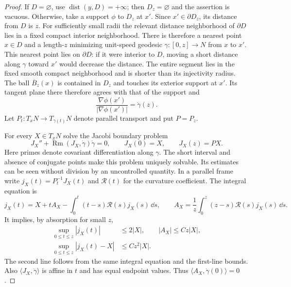 \begin{proof}
If $D=\varnothing$, use $\operatorname{dist}(y,D)=+\infty$;
then $D_z=\varnothing$ and the assertion is vacuous.  Otherwise,
take a support $\phi$ to $D_z$ at $x'$.  Since $x'\in\partial D_z$,
its distance from $D$ is $z$.  For sufficiently small radii the
relevant distance neighborhood of $\partial D$ lies in a fixed
compact interior neighborhood.  There is therefore a nearest point
$x\in D$ and a length-$z$ minimizing unit-speed geodesic
$\gamma:[0,z]\to N$ from $x$ to $x'$.  This nearest point lies on
$\partial D$: if it were interior to $D$, moving a short distance
along $\gamma$ toward $x'$ would decrease the distance.  The entire
segment lies in the fixed smooth compact neighborhood and is
shorter than its injectivity radius.  The ball
$\overline B_z(x)$ is contained in $D_z$ and touches its exterior
support at $x'$.  Its tangent plane there therefore agrees with that
of the support and
\begin{equation}\label{n3:domains:radial-normal}
 \frac{\nabla\phi(x')}{|\nabla\phi(x')|}=\dot\gamma(z).
\end{equation}
Let $P_t:T_xN\to T_{\gamma(t)}N$ denote parallel transport and put
$P=P_z$.

For every $X\in T_xN$ solve the Jacobi boundary problem
\begin{equation}\label{n3:domains:jacobi-endpoints}
 J_X''+\operatorname{Rm}(J_X,\dot\gamma)\dot\gamma=0,
 \qquad J_X(0)=X,\qquad J_X(z)=PX.
\end{equation}
Here primes denote covariant differentiation along $\gamma$.
The short interval and absence of conjugate points make this problem
uniquely solvable.  Its estimates can be seen without division by an
uncontrolled quantity.  In a parallel frame write
$j_X(t)=P_t^{-1}J_X(t)$ and $\mathcal R(t)$ for the curvature
coefficient.  The integral equation is
\[
 j_X(t)=X+tA_X-
       \int_0^t(t-s)\mathcal R(s)j_X(s)\,\dd s,
 \qquad
 A_X=\frac1z\int_0^z(z-s)\mathcal R(s)j_X(s)\,\dd s.
\]
It implies, by absorption for small $z$,
\begin{equation}\label{n3:domains:jacobi-estimates}
 \begin{aligned}
 \sup_{0\leq t\leq z}|j_X(t)|&\leq2|X|,
 \qquad |A_X|\leq Cz|X|,\\
 \sup_{0\leq t\leq z}|j_X(t)-X|&\leq Cz^2|X|.
 \end{aligned}
\end{equation}
The second line follows from the same integral equation and the
first-line bounds.
Also $\langle J_X,\dot\gamma\rangle$ is affine in $t$ and has
equal endpoint values.  Thus
$\langle A_X,\dot\gamma(0)\rangle=0$.


\end{proof}
